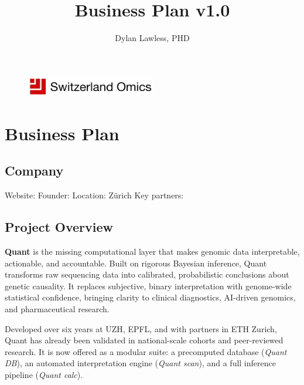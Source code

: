 \documentclass[preprint,12pt,fleqn]{article}
\newcommand{\version}{v1.0}
\begin{document}
\begin{figure}[t]
\centering \includegraphics[width=0.5\textwidth]{../resources/logo/logo_name_wide.png}
\end{figure}

\title{\Large \bf %
Business Plan {\version}}

\author[1]{\rm Dylan Lawless, PHD}
\maketitle
\color{swisseerieblack}
\tableofcontents
{} 
\clearpage


\section{Business Plan}

\subsection{Company}

Website:  \website
Founder:
Location: Zürich
Key partners: 

\subsection{Project Overview}

\textbf{Quant} is the missing computational layer that makes genomic data interpretable, actionable, and accountable. Built on rigorous Bayesian inference, Quant transforms raw sequencing data into calibrated, probabilistic conclusions about genetic causality. It replaces subjective, binary interpretation with genome-wide statistical confidence, bringing clarity to clinical diagnostics, AI-driven genomics, and pharmaceutical research.

Developed over six years at UZH, EPFL, and with partners in ETH Zurich, Quant has already been validated in national-scale cohorts and peer-reviewed research. It is now offered as a modular suite: a precomputed database (\textit{Quant DB}), an automated interpretation engine (\textit{Quant scan}), and a full inference pipeline (\textit{Quant calc}).
\end{document}
